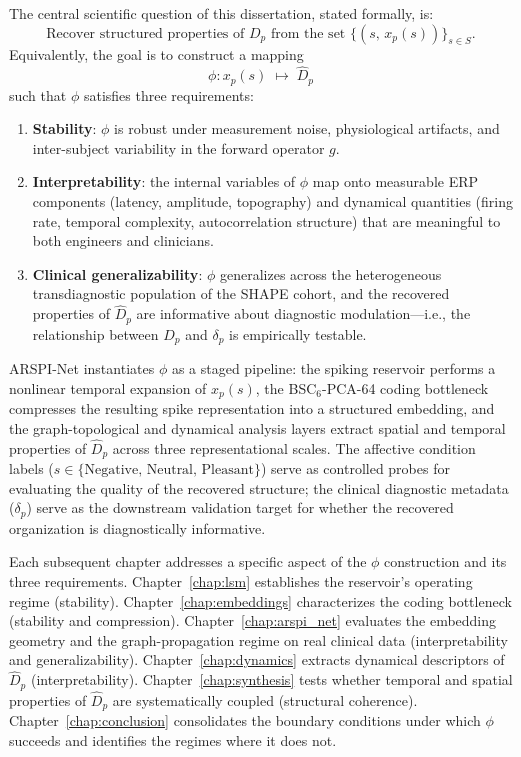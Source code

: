The central scientific question of this dissertation, stated formally, is:
\begin{equation}
    \text{Recover structured properties of } D_p \text{ from the set } \{(s,\, x_p(s))\}_{s \in S}.
    \label{eq:inverse_problem}
\end{equation}
Equivalently, the goal is to construct a mapping
\begin{equation}
    \phi: x_p(s) \;\mapsto\; \hat{D}_p
    \label{eq:phi}
\end{equation}
such that $\phi$ satisfies three requirements:
\begin{enumerate}
    \item \textbf{Stability}: $\phi$ is robust under measurement noise, physiological artifacts, and inter-subject variability in the forward operator $g$.
    \item \textbf{Interpretability}: the internal variables of $\phi$ map onto measurable ERP components (latency, amplitude, topography) and dynamical quantities (firing rate, temporal complexity, autocorrelation structure) that are meaningful to both engineers and clinicians.
    \item \textbf{Clinical generalizability}: $\phi$ generalizes across the heterogeneous transdiagnostic population of the SHAPE cohort, and the recovered properties of $\hat{D}_p$ are informative about diagnostic modulation---i.e., the relationship between $\hat{D}_p$ and $\delta_p$ is empirically testable.
\end{enumerate}

ARSPI-Net instantiates $\phi$ as a staged pipeline: the spiking reservoir performs a nonlinear temporal expansion of $x_p(s)$, the BSC$_6$-PCA-64 coding bottleneck compresses the resulting spike representation into a structured embedding, and the graph-topological and dynamical analysis layers extract spatial and temporal properties of $\hat{D}_p$ across three representational scales. The affective condition labels ($s \in \{\text{Negative, Neutral, Pleasant}\}$) serve as controlled probes for evaluating the quality of the recovered structure; the clinical diagnostic metadata ($\delta_p$) serve as the downstream validation target for whether the recovered organization is diagnostically informative.

Each subsequent chapter addresses a specific aspect of the $\phi$ construction and its three requirements. Chapter~\ref{chap:lsm} establishes the reservoir's operating regime (stability). Chapter~\ref{chap:embeddings} characterizes the coding bottleneck (stability and compression). Chapter~\ref{chap:arspi_net} evaluates the embedding geometry and the graph-propagation regime on real clinical data (interpretability and generalizability). Chapter~\ref{chap:dynamics} extracts dynamical descriptors of $\hat{D}_p$ (interpretability). Chapter~\ref{chap:synthesis} tests whether temporal and spatial properties of $\hat{D}_p$ are systematically coupled (structural coherence). Chapter~\ref{chap:conclusion} consolidates the boundary conditions under which $\phi$ succeeds and identifies the regimes where it does not.


